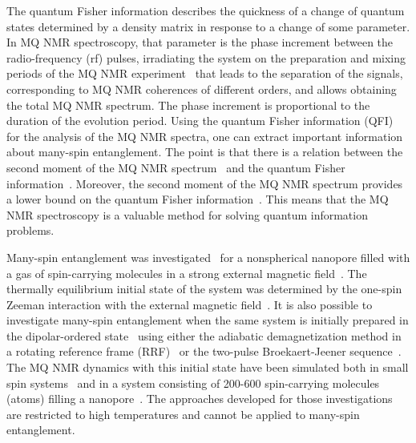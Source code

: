\documentclass[review]{elsarticle}
\begin{document}
The quantum Fisher information describes the quickness of a change of quantum states determined by a density matrix in response to a change of some parameter. 
In MQ NMR spectroscopy, that parameter is the phase increment between the radio-frequency (rf) pulses, irradiating the system on the preparation and mixing periods of the MQ NMR experiment~\cite{Baum_1985} 
that leads to the separation of the signals, corresponding to MQ NMR coherences of different orders, and allows obtaining the total MQ NMR spectrum. 
The phase increment is proportional to the duration of the evolution period.
Using the quantum Fisher information (QFI)~\cite{Liu_2014} for the analysis of the MQ NMR spectra, one can extract important information about many-spin entanglement.
The point is that there is a relation between the second moment of the MQ NMR spectrum~\cite{Khitrin_1997} and the quantum Fisher information~\cite{G_rttner_2018,Doronin_2019}.
Moreover, the second moment of the MQ NMR spectrum provides a lower bound on the quantum Fisher information~\cite{G_rttner_2018}.
This means that the MQ NMR spectroscopy is a valuable method for solving quantum information problems.

Many-spin entanglement was investigated~\cite{Doronin_2019} for a nonspherical nanopore filled with a gas of spin-carrying molecules in a strong external magnetic field~\cite{Baugh_2001,Doronin_2009}.
The thermally equilibrium initial state of the system was determined by the one-spin Zeeman interaction with the external magnetic field~\cite{Doronin_2007a}.
It is also possible to investigate many-spin entanglement when the same system is initially prepared in the dipolar-ordered state~\cite{Goldman_1970} using either the adiabatic demagnetization method in a rotating reference frame (RRF)~\cite{Goldman_1970,Slichter_1961} or the two-pulse Broekaert-Jeener sequence~\cite{Goldman_1970,Jeener_1967}.
The MQ NMR dynamics with this initial state have been simulated both in small spin systems~\cite{Doronin_2007a,Doronin_2007b} and in a system consisting of 200-600 spin-carrying molecules (atoms) filling a nanopore~\cite{Doronin_2011}.
The approaches developed for those investigations are restricted to  high temperatures and cannot be applied to  many-spin entanglement.
\end{document}
